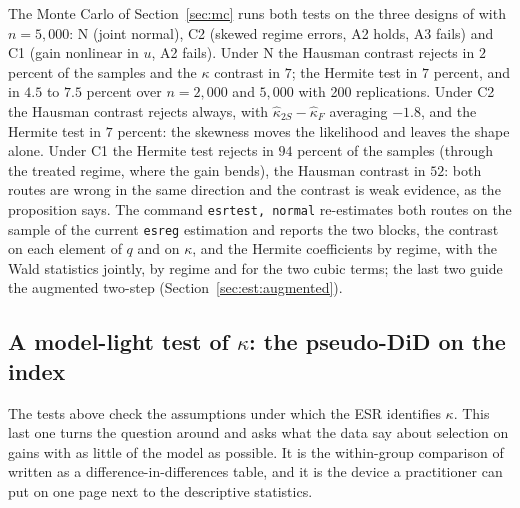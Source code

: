 \documentclass[11pt,a4paper]{article}
\theoremstyle{plain}
\theoremstyle{definition}
\theoremstyle{remark}
\newcommand{\1}{\mathbf{1}}
\newcommand{\cmd}[1]{\texttt{#1}}
\begin{document}
The Monte Carlo of Section~\ref{sec:mc} runs both tests on the three
designs of \citet{araar2026sog} with $n=5{,}000$: N (joint normal), C2
(skewed regime errors, A2 holds, A3 fails) and C1 (gain nonlinear in $u$,
A2 fails). Under N the Hausman contrast rejects in $2$ percent of the
samples and the $\kappa$ contrast in $7$; the Hermite test in $7$
percent, and in $4.5$ to $7.5$ percent over $n=2{,}000$ and $5{,}000$ with
200 replications. Under C2 the Hausman contrast rejects always, with
$\hat\kappa_{2S}-\hat\kappa_F$ averaging $-1.8$, and the Hermite test in
$7$ percent: the skewness moves the likelihood and leaves the shape
alone. Under C1 the Hermite test rejects in $94$ percent of the samples
(through the treated regime, where the gain bends), the Hausman contrast
in $52$: both routes are wrong in the same direction and the contrast is
weak evidence, as the proposition says. The command
\cmd{esrtest, normal} re-estimates both routes on the sample of the
current \cmd{esreg} estimation and reports the two blocks, the contrast
on each element of $q$ and on $\kappa$, and the Hermite coefficients by
regime, with the Wald statistics jointly, by regime and for the two cubic
terms; the last two guide the augmented two-step
(Section~\ref{sec:est:augmented}).

\subsection{A model-light test of \texorpdfstring{$\kappa$}{kappa}: the pseudo-DiD on the index}\label{sec:tests:pdid}

The tests above check the assumptions under which the ESR identifies
$\kappa$. This last one turns the question around and asks what the data
say about selection on gains with as little of the model as possible. It
is the within-group comparison of \citet[Proposition~4]{araar2026sog}
written as a difference-in-differences table, and it is the device a
practitioner can put on one page next to the descriptive statistics.
\end{document}
